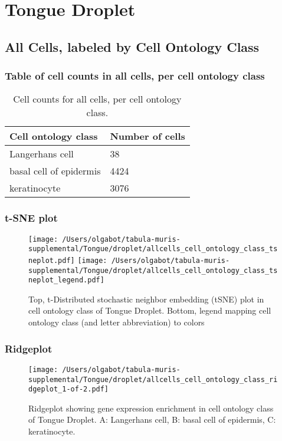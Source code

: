 \clearpage
\section{Tongue Droplet}

\subsection{All Cells, labeled by Cell Ontology Class}
\subsubsection{Table of cell counts in all cells, per cell ontology class}\begin{table}[h]
\centering
\label{my-label}
\begin{tabular}{@{}ll@{}}
\toprule

Cell ontology class& Number of cells \\ \midrule
Langerhans cell & 38 \\

basal cell of epidermis & 4424 \\

keratinocyte & 3076 \\
\bottomrule
\end{tabular}
\caption{Cell counts for all cells, per cell ontology class.}
\end{table}

\clearpage
\subsubsection{t-SNE plot}
\begin{figure}[h]
\centering
\texttt{[image: /Users/olgabot/tabula-muris-supplemental/Tongue/droplet/allcells\_cell\_ontology\_class\_tsneplot.pdf]}
\texttt{[image: /Users/olgabot/tabula-muris-supplemental/Tongue/droplet/allcells\_cell\_ontology\_class\_tsneplot\_legend.pdf]}
\caption{Top, t-Distributed stochastic neighbor embedding (tSNE) plot  in cell ontology class of Tongue Droplet. Bottom, legend mapping cell ontology class (and letter abbreviation) to colors}
\end{figure}


\clearpage
\clearpage
\subsubsection{Ridgeplot}
\begin{figure}[h]
\centering
\texttt{[image: /Users/olgabot/tabula-muris-supplemental/Tongue/droplet/allcells\_cell\_ontology\_class\_ridgeplot\_1-of-2.pdf]}

\caption{ Ridgeplot  showing gene expression enrichment in cell ontology class of Tongue Droplet. A: Langerhans cell, B: basal cell of epidermis, C: keratinocyte.}
\end{figure}


